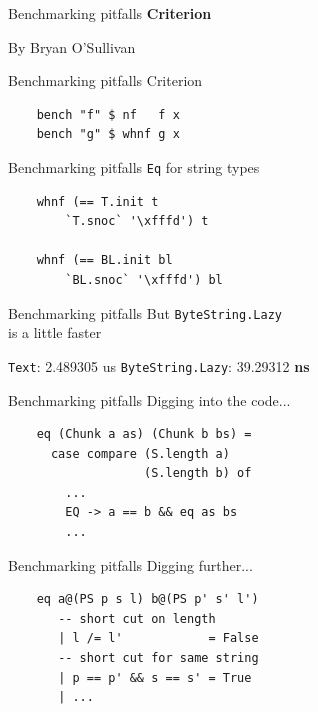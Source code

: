 \documentclass[20pt]{beamer}
\newcommand{\vspaced}{
    \vspace{5mm}
}
\begin{document}
\begin{frame}{Benchmarking pitfalls}
    \textbf{Criterion} \\
    \vspaced
    By Bryan O'Sullivan
\end{frame}

\begin{frame}[fragile]{Benchmarking pitfalls}
    Criterion \\
    \vspaced
    \begin{lstlisting}
    bench "f" $ nf   f x
    bench "g" $ whnf g x
    \end{lstlisting}
\end{frame}

\begin{frame}[fragile]{Benchmarking pitfalls}
    \texttt{Eq} for string types \\
    \vspaced
    \begin{lstlisting}
    whnf (== T.init t
        `T.snoc` '\xfffd') t

    whnf (== BL.init bl
        `BL.snoc` '\xfffd') bl
    \end{lstlisting}
\end{frame}

\begin{frame}{Benchmarking pitfalls}
    But \texttt{ByteString.Lazy} \\
    is a little faster \\
    \vspaced
    \texttt{Text}: 2.489305 us
    \texttt{ByteString.Lazy}: 39.29312 \textbf{ns}
\end{frame}

\begin{frame}[fragile]{Benchmarking pitfalls}
    Digging into the code... \\
    \vspaced
    \begin{lstlisting}
    eq (Chunk a as) (Chunk b bs) =
      case compare (S.length a)
                   (S.length b) of
        ...
        EQ -> a == b && eq as bs
        ...
    \end{lstlisting}
\end{frame}

\begin{frame}[fragile]{Benchmarking pitfalls}
    Digging further... \\
    \vspaced
    \begin{lstlisting}
    eq a@(PS p s l) b@(PS p' s' l')
       -- short cut on length
       | l /= l'            = False
       -- short cut for same string
       | p == p' && s == s' = True
       | ...
    \end{lstlisting}
\end{frame}
\end{document}
